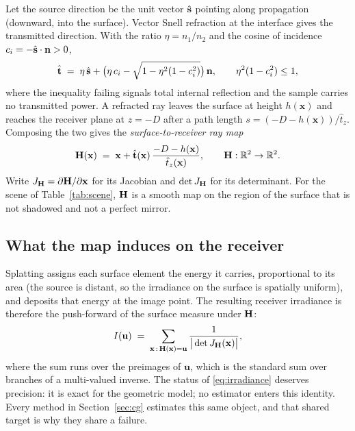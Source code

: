 Let the source direction be the unit vector $\hat{\mathbf{s}}$ pointing along propagation
(downward, into the surface). Vector Snell refraction at the interface gives the
transmitted direction. With the ratio $\eta = n_1/n_2$ and the cosine of
incidence $c_i = -\hat{\mathbf{s}} \cdot \mathbf{n} > 0$,
\begin{equation}
\hat{\mathbf{t}} \;=\; \eta\,\hat{\mathbf{s}} + \big(\eta\,c_i - \sqrt{1 - \eta^2(1 - c_i^2)}\big)\,\mathbf{n} ,
\qquad \eta^2(1-c_i^2) \le 1 ,
\label{eq:snell}
\end{equation}
where the inequality failing signals total internal reflection and the sample
carries no transmitted power. A refracted ray leaves the surface at height
$h(\mathbf{x})$ and reaches the receiver plane at $z = -D$ after a path length
$s = (-D - h(\mathbf{x}))/\hat t_z$. Composing the two gives the
\emph{surface-to-receiver ray map}
\begin{equation}
\mathbf{H}(\mathbf{x}) \;=\; \mathbf{x} + \hat{\mathbf{t}}(\mathbf{x})\,
\frac{-D - h(\mathbf{x})}{\hat t_z(\mathbf{x})},
\qquad
\mathbf{H} : \mathbb{R}^2 \to \mathbb{R}^2 .
\label{eq:raymap}
\end{equation}
Write $J_{\mathbf{H}} = \partial \mathbf{H} / \partial \mathbf{x}$ for its Jacobian and
$\det J_{\mathbf{H}}$ for its determinant. For the scene of Table~\ref{tab:scene},
$\mathbf{H}$ is a smooth map on the region of the surface that is not shadowed and not
a perfect mirror.

\subsection{What the map induces on the receiver}
\label{sec:pushforward}

Splatting assigns each surface element the energy it carries, proportional to
its area (the source is distant, so the irradiance on the surface is
spatially uniform), and deposits that energy at the image point. The resulting
receiver irradiance is therefore the push-forward of the surface measure under
$\mathbf{H}$:
\begin{equation}
I(\mathbf{u}) \;=\; \sum_{\mathbf{x}\,:\,\mathbf{H}(\mathbf{x}) = \mathbf{u}}
\frac{1}{\big|\det J_{\mathbf{H}}(\mathbf{x})\big|} ,
\label{eq:irradiance}
\end{equation}
where the sum runs over the preimages of $\mathbf{u}$, which is the standard
sum over branches of a multi-valued inverse. The status of \eqref{eq:irradiance} deserves precision: it is exact for the geometric model; no estimator enters this identity. Every method in Section~\ref{sec:cg} estimates this same object, and
that shared target is why they share a failure.

